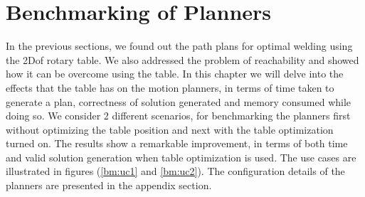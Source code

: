 \section{Benchmarking of Planners}
In the previous sections, we found out the path plans for optimal welding using the 2Dof rotary table. We also addressed the problem of reachability and showed how it can be overcome using the table. In this chapter we will delve into the effects that the table has on the motion planners, in terms of time taken to generate a plan, correctness of solution generated and memory consumed while doing so. We consider 2 different scenarios, for benchmarking the planners first without optimizing the table position and next with the table optimization turned on. The results show a remarkable improvement, in terms of both time and valid solution generation when table optimization is used. The use cases are illustrated in figures (\ref{bm:uc1} and \ref{bm:uc2}).
The configuration details of the planners are presented in the appendix section.
